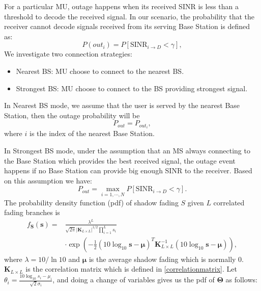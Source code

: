\par For a particular MU, outage happens when its received SINR is less than a threshold to decode the received signal. In our scenario, the probability that the receiver cannot decode signals received from its serving Base Station is defined as:
\begin{equation}
P(out_{i}) = P[\text{SINR}_{i\to D} < \gamma],
\end{equation}
We investigate two connection strategies: 
\begin{itemize}
\item Nearest BS: MU choose to connect to the nearest BS.
\item Strongest BS: MU choose to connect to the BS providing strongest signal.
\end{itemize}
\par In Nearest BS mode, we assume that the user is served by the nearest Base Station, then the outage probability will be 
\begin{equation}
P_{out} = P_{out_{i}},
\end{equation} 
where $i$ is the index of the nearest Base Station. 
\par In Strongest BS mode, under the assumption that an MS always connecting to the Base Station which provides the best received signal, the outage event happens if no Base Station can provide big enough SINR to the receiver. Based on this assumption we have:
\begin{equation}
P_{out} = \max_{i = 1,\cdots,N} P[\text{SINR}_{i\to D}<\gamma].
\end{equation}
The probability density function (pdf) of shadow fading $S$ given $L$ correlated fading branches is
\begin{equation}
\begin{split}
f_{\mathbf{S}}(\mathbf{s}) = &\frac{\lambda^{L}}{\sqrt{2\pi}|\mathbf{K}_{L\times L}|^{1/2}\prod_{i=1}^{L}s_{i}}\\
&\cdot\exp(-\frac{1}{2}(10\log_{10}\mathbf{s}-\boldsymbol{\mu})^{T}\mathbf{K}_{L\times L}^{-1}(10\log_{10}\mathbf{s}-\boldsymbol{\mu})),
\end{split}
\end{equation}
where $\lambda = 10/\ln10$ and $\boldsymbol{\mu}$ is the average shadow fading which is normally $0$. $\mathbf{K}_{L\times L}$ is the correlation matrix which is defined in \eqref{correlationmatrix}. Let $\theta_{i} = \frac{10\log_{10}s_{i}-\mu_{i}}{\sqrt{2}\sigma_{i}}$, and doing a change of variables gives us the pdf of $\mathbf{\Theta}$ as follows:
